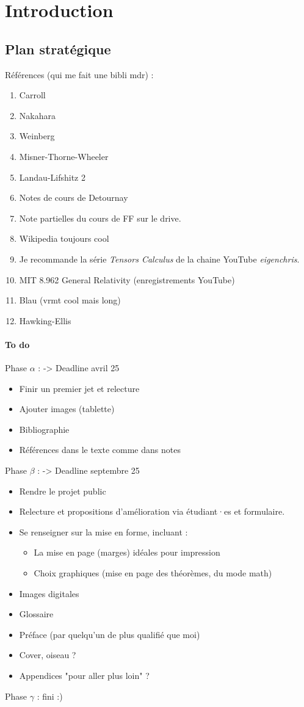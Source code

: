 \chapter{Introduction}
\section{Plan stratégique}
Références (qui me fait une bibli mdr) :
\begin{enumerate}
    \item Carroll
    \item Nakahara
    \item Weinberg
    \item Misner-Thorne-Wheeler
    \item Landau-Lifshitz 2
    \item Notes de cours de Detournay
    \item Note partielles du cours de FF sur le drive.
    \item Wikipedia toujours cool 
    \item Je recommande la série \emph{Tensors Calculus} de la chaine YouTube \emph{eigenchris}.
    \item MIT 8.962 General Relativity (enregistrements YouTube)
    \item Blau (vrmt cool mais long)
    \item Hawking-Ellis
\end{enumerate}
\subsubsection{To do}
Phase $\alpha$ : -> Deadline avril 25
\begin{itemize}
    \item Finir un premier jet et relecture
    \item Ajouter images (tablette)
    \item Bibliographie
    \item Références dans le texte comme dans notes
\end{itemize}
Phase $\beta$ : -> Deadline septembre 25
\begin{itemize}
    \item Rendre le projet public
    \item Relecture et propositions d'amélioration via étudiant·es et formulaire.
    \item Se renseigner sur la mise en forme, incluant :
    \begin{itemize}
        \item La mise en page (marges) idéales pour impression
        \item Choix graphiques (mise en page des théorèmes, du mode math)
    \end{itemize}
    \item Images digitales
    \item Glossaire
    \item Préface (par quelqu'un de plus qualifié que moi)
    \item Cover, oiseau ?
    \item Appendices "pour aller plus loin" ?
\end{itemize}
Phase $\gamma$ : fini :)

